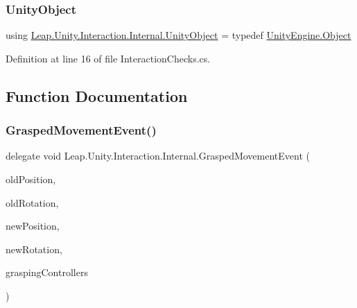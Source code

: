 \subsubsection{\texorpdfstring{UnityObject}{UnityObject}}
{\footnotesize\ttfamily using \mbox{\hyperlink{namespace_leap_1_1_unity_1_1_interaction_1_1_internal_afd0057d3352139df1a5ca0526cbabe20}{Leap.\+Unity.\+Interaction.\+Internal.\+Unity\+Object}} = typedef \mbox{\hyperlink{namespace_leap_1_1_unity_1_1_interaction_a7a6c3499f7b7d02b0d389e8ac72a315fa497031794414a552435f90151ac3b54b}{Unity\+Engine.\+Object}}}



Definition at line 16 of file Interaction\+Checks.\+cs.



\subsection{Function Documentation}
\mbox{\label{namespace_leap_1_1_unity_1_1_interaction_1_1_internal_a7aa34e7934479947979298ee96ced081}} 
\subsubsection{\texorpdfstring{GraspedMovementEvent()}{GraspedMovementEvent()}}
{\footnotesize\ttfamily delegate void Leap.\+Unity.\+Interaction.\+Internal.\+Grasped\+Movement\+Event (\begin{DoxyParamCaption}\item[{Vector3}]{old\+Position,  }\item[{Quaternion}]{old\+Rotation,  }\item[{Vector3}]{new\+Position,  }\item[{Quaternion}]{new\+Rotation,  }\item[{List$<$ \mbox{\hyperlink{class_leap_1_1_unity_1_1_interaction_1_1_interaction_controller}{Interaction\+Controller}} $>$}]{grasping\+Controllers }\end{DoxyParamCaption})}

